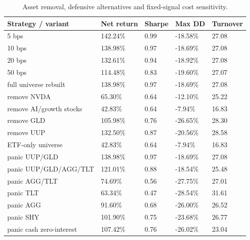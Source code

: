\begin{table}[htbp]
\caption{Asset removal, defensive alternatives and fixed-signal cost sensitivity.}
\label{tab:sensitivity-detail}
\begin{tabular}{lllll}
\toprule
Strategy / variant & Net return & Sharpe & Max DD & Turnover \\
\midrule
5 bps & 142.24\% & 0.99 & -18.58\% & 27.08 \\
10 bps & 138.98\% & 0.97 & -18.69\% & 27.08 \\
20 bps & 132.61\% & 0.94 & -18.92\% & 27.08 \\
50 bps & 114.48\% & 0.83 & -19.60\% & 27.07 \\
full universe rebuilt & 138.98\% & 0.97 & -18.69\% & 27.08 \\
remove NVDA & 65.30\% & 0.64 & -12.10\% & 25.22 \\
remove AI/growth stocks & 42.83\% & 0.64 & -7.94\% & 16.83 \\
remove GLD & 105.98\% & 0.76 & -26.65\% & 28.30 \\
remove UUP & 132.50\% & 0.87 & -20.56\% & 28.58 \\
ETF-only universe & 42.83\% & 0.64 & -7.94\% & 16.83 \\
panic UUP/GLD & 138.98\% & 0.97 & -18.69\% & 27.08 \\
panic UUP/GLD/AGG/TLT & 121.01\% & 0.88 & -18.54\% & 25.48 \\
panic AGG/TLT & 74.69\% & 0.56 & -27.75\% & 27.01 \\
panic TLT & 63.34\% & 0.47 & -28.54\% & 31.61 \\
panic AGG & 91.60\% & 0.68 & -26.00\% & 26.52 \\
panic SHY & 101.90\% & 0.75 & -23.68\% & 26.77 \\
panic cash zero-interest & 107.42\% & 0.76 & -26.02\% & 23.04 \\
\bottomrule
\end{tabular}
\end{table}
